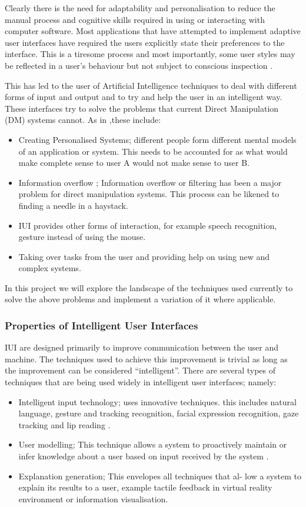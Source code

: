 Clearly there is the need for adaptability and personalisation to reduce the manual process and cognitive skills required in using or interacting with computer software. Most applications that have attempted to implement adaptive user interfaces have required the users explicitly state their preferences to the interface. This is a tiresome process and most importantly, some user styles may be reflected in a user's behaviour but not subject to conscious inspection \cite{langley1997machine}.

This has led to the user of Artificial Intelligence techniques to deal with different forms of input and output and to try and help the user in an intelligent way. These interfaces try to solve the problems that current Direct Manipulation (DM) systems cannot. As in \cite{patrick2003intelligent},these include:
\begin{itemize}
\item Creating Personalised Systems; different people form different mental models of an application or system. This needs to be accounted for as what would make complete sense to user A would not make sense to user B.
\item Information overflow ; Information overflow or filtering has been a major problem for direct manipulation systems. This process can be likened to finding a needle in a haystack.
\item IUI provides other forms of interaction, for example speech recognition, gesture instead of using the mouse.
\item Taking over tasks from the user and providing help on using new and complex systems.
\end{itemize}
In this project we will explore the landscape of the techniques used currently to solve the above problems and implement a variation of it where applicable.
\subsubsection{Properties of Intelligent User Interfaces}
IUI are designed primarily to improve communication between the user and machine. The techniques used to achieve this improvement is trivial as long as the improvement can be considered ``intelligent''.
There are several types of techniques that are being used widely in intelligent user interfaces; namely:
\begin{itemize}
\item Intelligent input technology; uses innovative techniques. this includes natural language, gesture and tracking recognition, facial expression recognition, gaze tracking and lip reading \cite{patrick2003intelligent}.
\item User modelling; This technique allows a system to proactively maintain or infer knowledge about a user based on input received by the system \cite{langley1997machine}.
\item Explanation generation; This envelopes all techniques that al- low a system to explain its results to a user, example tactile feedback in virtual reality environment or information visualisation.
\end{itemize}
